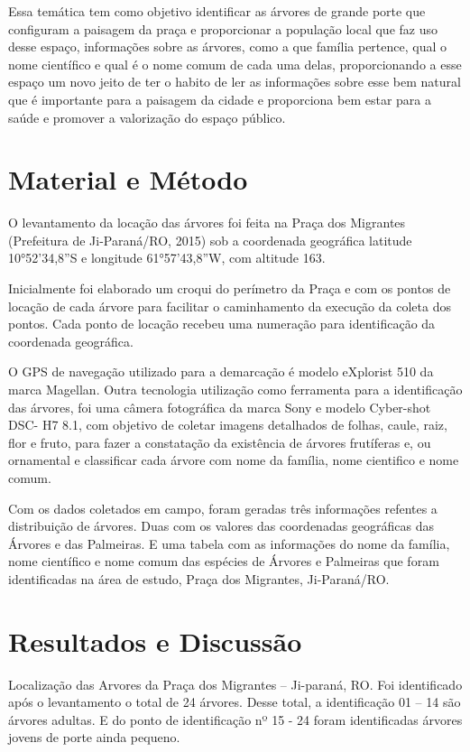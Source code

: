 \documentclass[article,12pt,onesidea,4paper,english,brazil]{abntex2}
\begin{document}
	Essa temática tem como objetivo identificar as árvores de grande porte que configuram a paisagem da praça e proporcionar a população local que faz uso desse espaço, informações sobre as árvores, como a que família pertence, qual o nome científico e qual é o nome comum de cada uma delas, proporcionando a esse espaço um novo jeito de ter o habito de ler as informações sobre esse bem natural que é importante para a paisagem da cidade e proporciona bem estar para a saúde e promover a valorização do espaço público. 
	
	\section*{Material e Método}
	
O levantamento da locação das árvores foi feita na Praça dos Migrantes (Prefeitura de Ji-Paraná/RO, 2015) sob a coordenada geográfica latitude 10°52’34,8”S e longitude 61°57’43,8”W, com altitude 163.

Inicialmente foi elaborado um croqui do perímetro da Praça e com os pontos de locação de cada árvore para facilitar o caminhamento da execução da coleta dos pontos. Cada ponto de locação recebeu uma numeração para identificação da coordenada geográfica.

O GPS de navegação utilizado para a demarcação é modelo eXplorist 510 da marca Magellan. Outra tecnologia utilização como ferramenta para a identificação das árvores, foi uma câmera fotográfica da marca Sony e modelo Cyber-shot DSC- H7 8.1, com objetivo de coletar imagens detalhados de folhas, caule, raiz, flor e  fruto, para fazer a constatação da existência de árvores frutíferas e, ou ornamental e classificar cada árvore com nome da família, nome cientifico e nome comum.

Com os dados coletados em campo, foram geradas três informações refentes a distribuição de árvores. Duas com os valores das coordenadas geográficas das Árvores e das Palmeiras. E uma tabela com as informações do nome da família, nome científico e nome comum das espécies de Árvores e Palmeiras que foram identificadas na área de estudo, Praça dos Migrantes, Ji-Paraná/RO.
	
	\section*{Resultados e Discussão}
	
Localização das Arvores da Praça dos Migrantes – Ji-paraná, RO.
Foi identificado após o levantamento o total de 24 árvores. Desse total, a identificação 01 – 14 são árvores adultas. E do ponto de identificação nº 15 - 24 foram identificadas árvores jovens de porte ainda pequeno.
\end{document}
